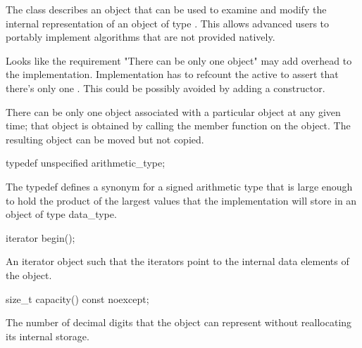 \begin{addedblock}
The class describes an object that can be used to examine and modify the internal representation of an object of type . This allows advanced users to portably implement algorithms that are not provided natively.

\begin{modifcommentblock}
Looks like the requirement "There can be only one  object" may add overhead to the implementation. Implementation has to refcount the active  to assert that there's only one . This could be possibly avoided by adding a  constructor.
\end{modifcommentblock}

There can be only one  object associated with a particular  object at any given time; that object is obtained by calling the  member function on the  object. The resulting object can be moved but not copied.

\begin{itemdecl}
typedef unspecified arithmetic_type;	
\end{itemdecl}

\begin{itemdescr}
The typedef defines a synonym for a signed arithmetic type that is large enough to hold the product of the largest values that the implementation will store in an object of type data_type.	
\end{itemdescr}

\begin{itemdecl}
iterator begin();		
\end{itemdecl}

\begin{itemdescr}
\returns An iterator object such that the iterators \tcode{[begin(), end())} point to the internal data elements of the  object.		
\end{itemdescr}

\begin{itemdecl}
size_t capacity() const noexcept;		
\end{itemdecl}

\begin{itemdescr}
\returns The number of decimal digits that the  object can represent without reallocating its internal storage.		
\end{itemdescr}


\end{addedblock}
